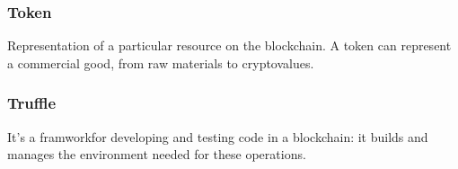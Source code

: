 \subsubsection*{Token}
Representation of a particular resource on the blockchain\glo. A token can represent a commercial good, from raw materials to cryptovalues. 

\subsubsection*{Truffle}
It's a framwork\glosp for developing and testing code in a blockchain\glo: it builds and manages the environment needed for these operations.





